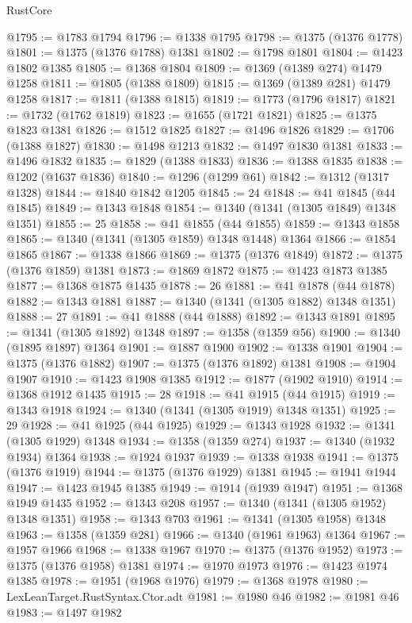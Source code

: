 \begin{lexlean}{RustCore}
\begin{coremodule}
@1795 := @1783 @1794
@1796 := @1338 @1795
@1798 := @1375 (@1376 @1778)
@1801 := @1375 (@1376 @1788) @1381
@1802 := @1798 @1801
@1804 := @1423 @1802 @1385
@1805 := @1368 @1804
@1809 := @1369 (@1389 @274) @1479 @1258
@1811 := @1805 (@1388 @1809)
@1815 := @1369 (@1389 @281) @1479 @1258
@1817 := @1811 (@1388 @1815)
@1819 := @1773 (@1796 @1817)
@1821 := @1732 (@1762 @1819)
@1823 := @1655 (@1721 @1821)
@1825 := @1375 @1823 @1381
@1826 := @1512 @1825
@1827 := @1496 @1826
@1829 := @1706 (@1388 @1827)
@1830 := @1498 @1213
@1832 := @1497 @1830 @1381
@1833 := @1496 @1832
@1835 := @1829 (@1388 @1833)
@1836 := @1388 @1835
@1838 := @1202 (@1637 @1836)
@1840 := @1296 (@1299 @61)
@1842 := @1312 (@1317 @1328)
@1844 := @1840 @1842 @1205
@1845 := 24
@1848 := @41 @1845 (@44 @1845)
@1849 := @1343 @1848
@1854 := @1340 (@1341 (@1305 @1849) @1348 @1351)
@1855 := 25
@1858 := @41 @1855 (@44 @1855)
@1859 := @1343 @1858
@1865 := @1340 (@1341 (@1305 @1859) @1348 @1448) @1364
@1866 := @1854 @1865
@1867 := @1338 @1866
@1869 := @1375 (@1376 @1849)
@1872 := @1375 (@1376 @1859) @1381
@1873 := @1869 @1872
@1875 := @1423 @1873 @1385
@1877 := @1368 @1875 @1435
@1878 := 26
@1881 := @41 @1878 (@44 @1878)
@1882 := @1343 @1881
@1887 := @1340 (@1341 (@1305 @1882) @1348 @1351)
@1888 := 27
@1891 := @41 @1888 (@44 @1888)
@1892 := @1343 @1891
@1895 := @1341 (@1305 @1892) @1348
@1897 := @1358 (@1359 @56)
@1900 := @1340 (@1895 @1897) @1364
@1901 := @1887 @1900
@1902 := @1338 @1901
@1904 := @1375 (@1376 @1882)
@1907 := @1375 (@1376 @1892) @1381
@1908 := @1904 @1907
@1910 := @1423 @1908 @1385
@1912 := @1877 (@1902 @1910)
@1914 := @1368 @1912 @1435
@1915 := 28
@1918 := @41 @1915 (@44 @1915)
@1919 := @1343 @1918
@1924 := @1340 (@1341 (@1305 @1919) @1348 @1351)
@1925 := 29
@1928 := @41 @1925 (@44 @1925)
@1929 := @1343 @1928
@1932 := @1341 (@1305 @1929) @1348
@1934 := @1358 (@1359 @274)
@1937 := @1340 (@1932 @1934) @1364
@1938 := @1924 @1937
@1939 := @1338 @1938
@1941 := @1375 (@1376 @1919)
@1944 := @1375 (@1376 @1929) @1381
@1945 := @1941 @1944
@1947 := @1423 @1945 @1385
@1949 := @1914 (@1939 @1947)
@1951 := @1368 @1949 @1435
@1952 := @1343 @208
@1957 := @1340 (@1341 (@1305 @1952) @1348 @1351)
@1958 := @1343 @703
@1961 := @1341 (@1305 @1958) @1348
@1963 := @1358 (@1359 @281)
@1966 := @1340 (@1961 @1963) @1364
@1967 := @1957 @1966
@1968 := @1338 @1967
@1970 := @1375 (@1376 @1952)
@1973 := @1375 (@1376 @1958) @1381
@1974 := @1970 @1973
@1976 := @1423 @1974 @1385
@1978 := @1951 (@1968 @1976)
@1979 := @1368 @1978
@1980 := LexLeanTarget.RustSyntax.Ctor.adt
@1981 := @1980 @46
@1982 := @1981 @46
@1983 := @1497 @1982

\end{coremodule}
\end{lexlean}
